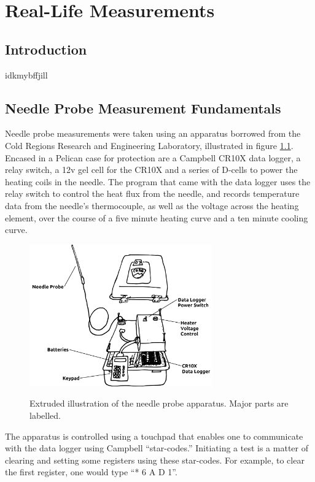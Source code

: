 \chapter{Real-Life Measurements}

\section{Introduction}

idkmybffjill

\section{Needle Probe Measurement Fundamentals}

Needle probe measurements were taken using an apparatus borrowed from the Cold
Regions Research and Engineering Laboratory, illustrated in figure
\ref{fig:apparatus}. Encased in a Pelican case for protection are a Campbell
CR10X data logger, a relay switch, a 12v gel cell for the CR10X and a series of
D-cells to power the heating coils in the needle. The program that came with the
data logger uses the relay switch to control the heat flux from the needle, and
records temperature data from the needle's thermocouple, as well as the voltage
across the heating element, over the course of a five minute heating curve and
a ten minute cooling curve.

\begin{figure}[h]
\centering
\includegraphics[width=0.7\textwidth]{fig/apparatus.png}
\label{fig:apparatus}
\caption{Extruded illustration of the needle probe apparatus. Major parts are labelled.}
\end{figure}

The apparatus is controlled using a touchpad that enables one to communicate
with the data logger using Campbell ``star-codes.'' Initiating a test is a
matter of clearing and setting some registers using these star-codes. For
example, to clear the first register, one would type ``* 6 A D 1''.

